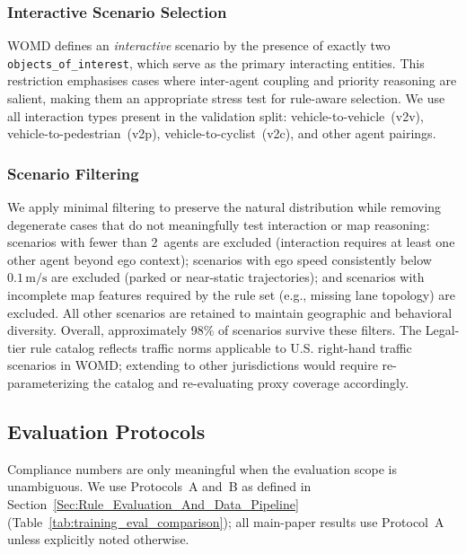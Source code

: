 \subsubsection{Interactive Scenario Selection}

WOMD defines an \emph{interactive} scenario by the presence of exactly two \texttt{objects\_of\_interest}, which serve as the primary interacting entities.  This restriction emphasises cases where inter-agent coupling and priority reasoning are salient, making them an appropriate stress test for rule-aware selection.  We use all interaction types present in the validation split: vehicle-to-vehicle~(v2v), vehicle-to-pedestrian~(v2p), vehicle-to-cyclist~(v2c), and other agent pairings.

\subsubsection{Scenario Filtering}

We apply minimal filtering to preserve the natural distribution while removing degenerate cases that do not meaningfully test interaction or map reasoning: scenarios with fewer than 2~agents are excluded (interaction requires at least one other agent beyond ego context); scenarios with ego speed consistently below $0.1\,\text{m/s}$ are excluded (parked or near-static trajectories); and scenarios with incomplete map features required by the rule set (e.g., missing lane topology) are excluded.  All other scenarios are retained to maintain geographic and behavioral diversity.  Overall, approximately 98\% of scenarios survive these filters. The Legal-tier rule catalog reflects traffic norms applicable to U.S. right-hand traffic scenarios in WOMD; extending to other jurisdictions would require re-parameterizing the catalog and re-evaluating proxy coverage accordingly.

\subsection{Evaluation Protocols}
\label{subsec:eval_protocols}

Compliance numbers are only meaningful when the evaluation scope is unambiguous.  We use Protocols~A and~B as defined in Section~\ref{Sec:Rule_Evaluation_And_Data_Pipeline} (Table~\ref{tab:training_eval_comparison}); all main-paper results use Protocol~A unless explicitly noted otherwise.

